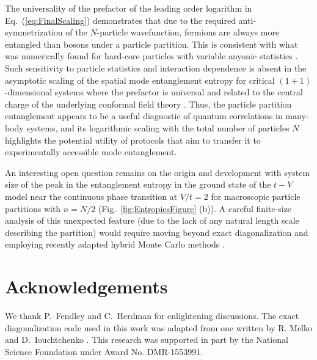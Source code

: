 The universality of the prefactor of the leading order logarithm in
Eq.~(\ref{eq:FinalScaling}) demonstrates that due to the required
anti-symmetrization of the $N$-particle wavefunction, fermions are always more
entangled than bosons under a particle partition. This is consistent with what
was numerically found for hard-core particles with variable anyonic statistics
\cite{Santachiara:2007il}.  Such sensitivity to particle statistics and
interaction dependence is absent in the asymptotic scaling of the spatial mode
entanglement entropy for critical $(1+1)$-dimensional systems where the
prefactor is universal and related to the central charge of the underlying
conformal field theory \cite{Calabrese:2004hl}.  Thus, the particle partition
entanglement appears to be a useful diagnostic of quantum correlations in
many-body systems, and its logarithmic scaling with the total number of
particles $N$ highlights the potential utility of protocols
\cite{Killoran:2014gu} that aim to transfer it to experimentally accessible
mode entanglement.

An interesting open question remains on the origin and development with system
size of the peak in the entanglement entropy in the ground state of
the $t-V$ model near the continuous phase transition at $V/t = 2$ for
macroscopic particle partitions with $n = N/2$
(Fig.~\ref{fig:EntropiesFigure} (b)). A careful finite-size analysis of this
unexpected feature (due to the lack of any natural length scale describing the
partition) would require moving beyond exact diagonalization 
and employing recently adapted hybrid Monte Carlo methods
\cite{Drut:2015fs,Drut:2016el,Porter:2016ft}. 



\section{Acknowledgements}
We thank P.~Fendley and C.~Herdman for enlightening discussions.  The exact
diagonalization code used in this work was adapted from one written by R. Melko
and D.~Iouchtchenko \cite{code}. This research was supported in part by the
National Science Foundation under Award No. DMR-1553991. 
